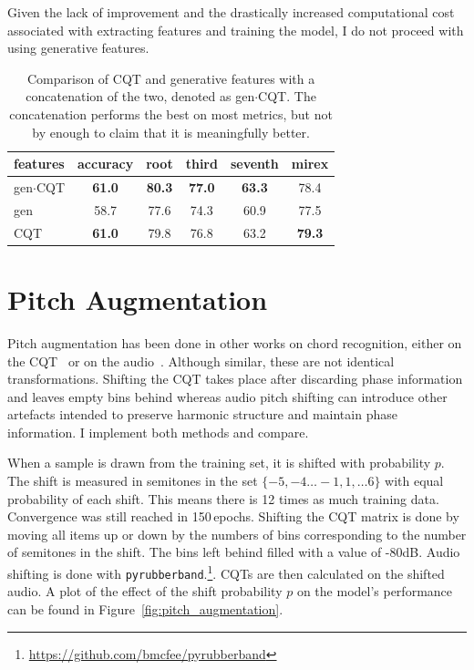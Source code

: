 Given the lack of improvement and the drastically increased computational cost associated with extracting features and training the model, I do not proceed with using generative features.

\begin{table}
    \centering
    \begin{tabular}{lccccc}
        \toprule
        features & accuracy & root  & third & seventh & mirex \\  
        \midrule
        gen$\cdot$CQT  & \textbf{61.0}     & \textbf{80.3}  & \textbf{77.0}  & \textbf{63.3}    & 78.4  \\
        gen      & 58.7     & 77.6  & 74.3  & 60.9    & 77.5  \\
        CQT      & \textbf{61.0}     & 79.8  & 76.8  & 63.2    & \textbf{79.3}  \\
        \bottomrule
    \end{tabular}
    \caption{Comparison of CQT and generative features with a concatenation of the two, denoted as gen$\cdot$CQT. The concatenation performs the best on most metrics, but not by enough to claim that it is meaningfully better. }\label{tab:gen_feature_comparison}
\end{table}

\section{Pitch Augmentation}\label{sec:pitch-augmentation}

Pitch augmentation has been done in other works on chord recognition, either on the CQT~\citep{ACRLargeVocab1} or on the audio~\citep{BTC,StructuredTraining}. Although similar, these are not identical transformations. Shifting the CQT takes place after discarding phase information and leaves empty bins behind whereas audio pitch shifting can introduce other artefacts intended to preserve harmonic structure and maintain phase information. I implement both methods and compare.

When a sample is drawn from the training set, it is shifted with probability $p$. The shift is measured in semitones in the set $\{-5,-4\ldots -1, 1, \ldots 6\}$ with equal probability of each shift. This means there is 12 times as much training data. Convergence was still reached in 150\,epochs. Shifting the CQT matrix is done by moving all items up or down by the numbers of bins corresponding to the number of semitones in the shift. The bins left behind filled with a value of -80dB. Audio shifting is done with \texttt{pyrubberband}.\footnote{\url{https://github.com/bmcfee/pyrubberband}}. CQTs are then calculated on the shifted audio. A plot of the effect of the shift probability $p$ on the model's performance can be found in Figure~\ref{fig:pitch_augmentation}.

